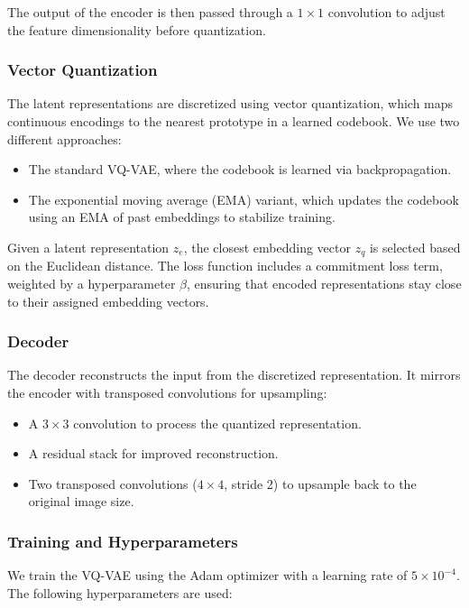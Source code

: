 The output of the encoder is then passed through a $1 \times 1$ convolution to adjust the feature dimensionality before quantization.

\subsubsection{Vector Quantization}
The latent representations are discretized using vector quantization, which maps continuous encodings to the nearest prototype in a learned codebook. We use two different approaches: 

\begin{itemize}
    \item The standard VQ-VAE, where the codebook is learned via backpropagation.
    \item The exponential moving average (EMA) variant, which updates the codebook using an EMA of past embeddings to stabilize training.
\end{itemize}

Given a latent representation $z_e$, the closest embedding vector $z_q$ is selected based on the Euclidean distance. The loss function includes a commitment loss term, weighted by a hyperparameter $\beta$, ensuring that encoded representations stay close to their assigned embedding vectors.

\subsubsection{Decoder}
The decoder reconstructs the input from the discretized representation. It mirrors the encoder with transposed convolutions for upsampling:

\begin{itemize}
    \item A $3 \times 3$ convolution to process the quantized representation.
    \item A residual stack for improved reconstruction.
    \item Two transposed convolutions ($4 \times 4$, stride 2) to upsample back to the original image size.
\end{itemize}

\subsubsection{Training and Hyperparameters}
We train the VQ-VAE using the Adam optimizer with a learning rate of $5 \times 10^{-4}$. The following hyperparameters are used:

